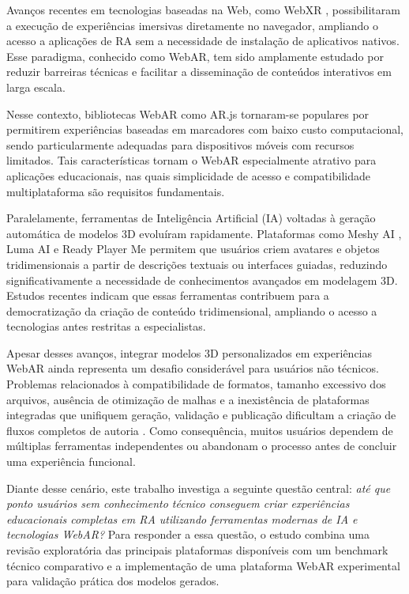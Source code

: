 \documentclass[conference]{IEEEtran}
\begin{document}
Avanços recentes em tecnologias baseadas na Web, como WebXR \cite{webxr2020}, possibilitaram a execução de experiências imersivas diretamente no navegador, ampliando o acesso a aplicações de RA sem a necessidade de instalação de aplicativos nativos. Esse paradigma, conhecido como WebAR, tem sido amplamente estudado por reduzir barreiras técnicas e facilitar a disseminação de conteúdos interativos em larga escala.

Nesse contexto, bibliotecas WebAR como AR.js \cite{arjs} tornaram-se populares por permitirem experiências baseadas em marcadores com baixo custo computacional, sendo particularmente adequadas para dispositivos móveis com recursos limitados. Tais características tornam o WebAR especialmente atrativo para aplicações educacionais, nas quais simplicidade de acesso e compatibilidade multiplataforma são requisitos fundamentais.

Paralelamente, ferramentas de Inteligência Artificial (IA) voltadas à geração automática de modelos 3D evoluíram rapidamente. Plataformas como Meshy AI \cite{meshy2024}, Luma AI \cite{lumaai2024} e Ready Player Me \cite{readyplayerme} permitem que usuários criem avatares e objetos tridimensionais a partir de descrições textuais ou interfaces guiadas, reduzindo significativamente a necessidade de conhecimentos avançados em modelagem 3D. Estudos recentes indicam que essas ferramentas contribuem para a democratização da criação de conteúdo tridimensional, ampliando o acesso a tecnologias antes restritas a especialistas.

Apesar desses avanços, integrar modelos 3D personalizados em experiências WebAR ainda representa um desafio considerável para usuários não técnicos. Problemas relacionados à compatibilidade de formatos, tamanho excessivo dos arquivos, ausência de otimização de malhas e a inexistência de plataformas integradas que unifiquem geração, validação e publicação dificultam a criação de fluxos completos de autoria \cite{ruiz2020arbeginner}. Como consequência, muitos usuários dependem de múltiplas ferramentas independentes ou abandonam o processo antes de concluir uma experiência funcional.

Diante desse cenário, este trabalho investiga a seguinte questão central: \textit{até que ponto usuários sem conhecimento técnico conseguem criar experiências educacionais completas em RA utilizando ferramentas modernas de IA e tecnologias WebAR?} Para responder a essa questão, o estudo combina uma revisão exploratória das principais plataformas disponíveis com um benchmark técnico comparativo e a implementação de uma plataforma WebAR experimental para validação prática dos modelos gerados.
\end{document}
